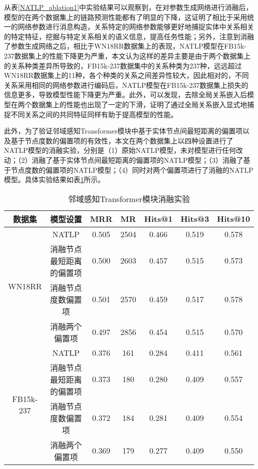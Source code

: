 从表\ref{NATLP_ablation1}中实验结果可以观察到，在对参数生成网络进行消融后，模型的在两个数据集上的链路预测性能都有了明显的下降，这证明了相比于采用统一的网络参数进行消息构造，关系特定的网络参数能够更好地捕捉实体中关系相关的特定特征，挖掘与特定关系相关的语义信息，提高任务性能；另外，注意到消融了参数生成网络之后，相比于WN18RR数据集上的表现，NATLP模型在FB15k-237数据集上的性能下降更为严重，本文认为这样的差异主要是由于两个数据集上的关系种类差异所导致的，FB15k-237数据集中的关系种类为237种，远远超过WN18RR数据集上的11种，各个种类的关系之间差异性较大，因此相对的，不同关系采用相同的网络参数进行编码后，NATLP模型在FB15k-237数据集上损失的信息更多，导致模型性能下降更为严重。此外，可以发现，去除全局关系嵌入后模型在两个数据集上的性能也出现了一定的下滑，证明了通过全局关系嵌入显式地捕捉不同关系之间的共同特征同样有助于提高模型的性能。

此外，为了验证邻域感知Transformer模块中基于实体节点间最短距离的偏置项以及基于节点度数的偏置项的有效性，本文在两个数据集上以四种设置进行了NATLP模型的消融实验，分别是（1）原始NATLP模型，未对模型进行任何改动；（2）消融了基于实体节点间最短距离的偏置项的NATLP模型；（3）消融了基于节点度数的偏置项的NATLP模型；（4）同时对两个偏置项进行了消融的NATLP模型。具体实验结果如表\ref{NATLP_ablation2}所示。

\begin{table}[htbp]
  \begin{center}
      \caption{邻域感知Transformer模块消融实验}
      \setlength{\tabcolsep}{8pt}
      \renewcommand\arraystretch{1.5}
      \begin{tabular}{*{7}{c}}
          \toprule
          数据集 & 模型设置 & MRR&MR&Hits@1&Hits@3&	Hits@10\\
          \midrule
          \multirow{4}{*}{WN18RR}&NATLP&0.505&2504&0.466&0.519&0.578\\
          &消融节点最短距离的偏置项&0.500&2603&0.457&0.515&0.573\\
          &消融节点度数偏置项&0.501&2570&0.459&0.517&0.578\\
          &消融两个偏置项&0.497&2856&0.454&0.515&0.570\\
          \cmidrule{1-7}
          \multirow{4}{*}{FB15k-237}&NATLP&0.376&161&0.284&0.411&0.561\\
          &消融节点最短距离的偏置项&0.373&180&0.280&0.409&0.557\\
          &消融节点度数偏置项&0.372&184&0.281&0.409&0.554\\
          &消融两个偏置项&0.369&179&0.277&0.409&0.550\\
          \bottomrule
      \end{tabular}
      \label{NATLP_ablation2}
  \end{center}
\end{table}


